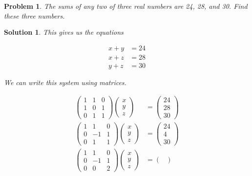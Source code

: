 \documentclass{article}
\newtheorem*{problem}{Problem}
\newtheorem*{solution}{Solution}
\begin{document}
\begin{problem}
The sums of any two of three real numbers are 24, 28, and 30. Find these three numbers.
\end{problem}

\begin{solution}
This gives us the equations

\begin{align*}
x + y &= 24 \\
x + z &= 28 \\
y + z &= 30
\end{align*}

We can write this system using matrices.

\begin{align*}
\begin{pmatrix}
1 & 1 & 0 \\
1 & 0 & 1 \\
0 & 1 & 1
\end{pmatrix}
\begin{pmatrix}
x \\ y \\ z 
\end{pmatrix}
&= 
\begin{pmatrix}
24 \\ 28 \\ 30
\end{pmatrix} \\
\begin{pmatrix}
1 & 1 & 0 \\
0 & -1 & 1 \\
0 & 1 & 1
\end{pmatrix}
\begin{pmatrix}
x \\ y \\ z 
\end{pmatrix}
&= 
\begin{pmatrix}
24 \\ 4 \\ 30
\end{pmatrix} \\
\begin{pmatrix}
1 & 1 & 0 \\
0 & -1 & 1 \\
0 & 0 & 2
\end{pmatrix}
\begin{pmatrix}
x \\ y \\ z 
\end{pmatrix}
&= 
\begin{pmatrix}

\end{pmatrix}
\end{align*}
\end{solution}
\end{document}
